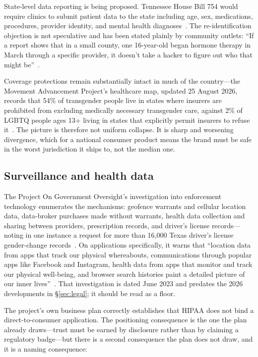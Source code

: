 \documentclass[11pt,a4paper]{article}
\begin{document}
State-level data reporting is being proposed. Tennessee House Bill 754
would require clinics to submit patient data to the state including
age, sex, medications, procedures, provider identity, and mental health
diagnoses~\cite{transvitae}. The re-identification objection is not
speculative and has been stated plainly by community outlets: ``If a
report shows that in a small county, one 16-year-old began hormone
therapy in March through a specific provider, it doesn't take a hacker
to figure out who that might be''~\cite{transvitae}.

Coverage protections remain substantially intact in much of the
country---the Movement Advancement Project's healthcare map, updated
25 August 2026, records that 54\% of transgender people live in states
where insurers are prohibited from excluding medically necessary
transgender care, against 2\% of LGBTQ people ages 13+ living in states
that explicitly permit insurers to refuse it~\cite{map}. The picture is
therefore not uniform collapse. It is sharp and worsening divergence,
which for a national consumer product means the brand must be safe in
the worst jurisdiction it ships to, not the median one.

\subsection{Surveillance and health data}
\label{sec:surveillance}

The Project On Government Oversight's investigation into enforcement
technology enumerates the mechanisms: geofence warrants and cellular
location data, data-broker purchases made without warrants, health data
collection and sharing between providers, prescription records, and
driver's license records---noting in one instance a request for more
than 16,000 Texas driver's license gender-change
records~\cite{pogo}. On applications specifically, it warns that
``location data from apps that track our physical whereabouts,
communications through popular apps like Facebook and Instagram, health
data from apps that monitor and track our physical well-being, and
browser search histories paint a detailed picture of our inner
lives''~\cite{pogo}. That investigation is dated June 2023 and predates
the 2026 developments in \S\ref{sec:legal}; it should be read as a floor.

The project's own business plan correctly establishes that HIPAA does
not bind a direct-to-consumer application. The positioning consequence
is the one the plan already draws---trust must be earned by disclosure
rather than by claiming a regulatory badge---but there is a second
consequence the plan does not draw, and it is a naming consequence:
\end{document}
